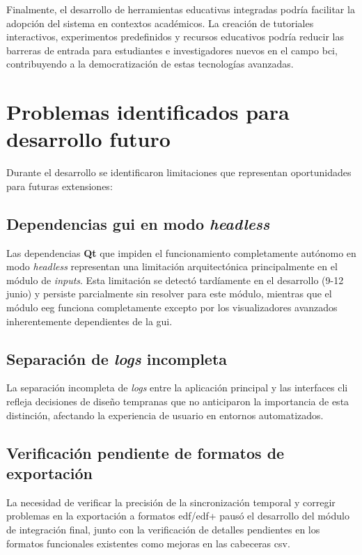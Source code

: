 Finalmente, el desarrollo de herramientas educativas integradas podría facilitar la adopción del sistema en contextos académicos. La creación de tutoriales interactivos, experimentos predefinidos y recursos educativos podría reducir las barreras de entrada para estudiantes e investigadores nuevos en el campo \acrshort{bci}, contribuyendo a la democratización de estas tecnologías avanzadas.

\section{Problemas identificados para desarrollo futuro}
\label{sec:problemas_desarrollo_futuro}

Durante el desarrollo se identificaron limitaciones que representan oportunidades para futuras extensiones:

\subsection{Dependencias \acrshort{gui} en modo \textit{\gls{headless}}}
\label{subsec:dependencias_gui_headless}

Las dependencias \textbf{Qt} que impiden el funcionamiento completamente autónomo en modo \textit{\gls{headless}} representan una limitación arquitectónica principalmente en el módulo de \textit{inputs}. Esta limitación se detectó tardíamente en el desarrollo (9-12 junio) y persiste parcialmente sin resolver para este módulo, mientras que el módulo \acrshort{eeg} funciona completamente excepto por los visualizadores avanzados inherentemente dependientes de la \acrshort{gui}.

\subsection{Separación de \textit{logs} incompleta}
\label{subsec:separacion_logs}

La separación incompleta de \textit{logs} entre la aplicación principal y las interfaces \acrshort{cli} refleja decisiones de diseño tempranas que no anticiparon la importancia de esta distinción, afectando la experiencia de usuario en entornos automatizados.

\subsection{Verificación pendiente de formatos de exportación}
\label{subsec:verificacion_exportacion}

La necesidad de verificar la precisión de la sincronización temporal y corregir problemas en la exportación a formatos \acrshort{edf}/\acrshort{edf+} pausó el desarrollo del módulo de integración final, junto con la verificación de detalles pendientes en los formatos funcionales existentes como mejoras en las cabeceras \acrshort{csv}.